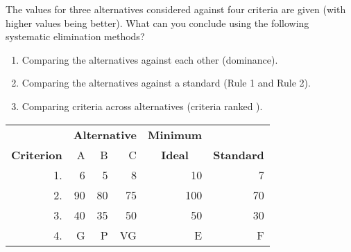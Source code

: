 \begin{exercises}
    \begin{exercise}
    \label{sea-07-19}
        The values for three alternatives considered against four criteria are given (with higher values being better). What can you conclude using the following systematic elimination methods?
        \begin{enumerate}[label=\alph*)]
            \item Comparing the alternatives against each other (dominance).
            \item Comparing the alternatives against a standard (Rule 1 and Rule 2).
            \item Comparing criteria across alternatives (criteria ranked  ).
        \end{enumerate}
        \begin{table}[h]
        \centering
        \begin{tabular}{r r r r r r}
        \toprule
         & \multicolumn{3}{c}{\textbf{Alternative}} & \multicolumn{1}{c}{\textbf{Minimum}} \\
        \cmidrule{2-4}
        \multicolumn{1}{c}{\textbf{Criterion}} & A & B & C & \multicolumn{1}{c}{\textbf{Ideal}} & \multicolumn{1}{c}{\textbf{Standard}} \\
        \midrule
        1. & 6  & 5  & 8  & 10  & 7  \\
        2. & 90 & 80 & 75 & 100 & 70 \\
        3. & 40 & 35 & 50 & 50  & 30 \\
        4. & G  & P  & VG & E   & F  \\
        \bottomrule
        \end{tabular}
        \label{tab:sea-07-19} %
        \end{table}
    \end{exercise}
    \begin{solution}
    \end{solution}
    

\end{exercises}
